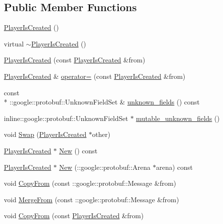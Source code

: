 \subsection*{Public Member Functions}
\begin{DoxyCompactItemize}
\item 
\hyperlink{class_player_is_created_a02bf8ba34256de7cdf0660fc59c87ddc}{Player\-Is\-Created} ()
\item 
virtual \hyperlink{class_player_is_created_a03ae27dcddd046854572755260a782b1}{$\sim$\-Player\-Is\-Created} ()
\item 
\hyperlink{class_player_is_created_ae905e532042d12b2c289b3affb8dd903}{Player\-Is\-Created} (const \hyperlink{class_player_is_created}{Player\-Is\-Created} \&from)
\item 
\hyperlink{class_player_is_created}{Player\-Is\-Created} \& \hyperlink{class_player_is_created_aef6d923f253b5eb33ac0623f73290e4e}{operator=} (const \hyperlink{class_player_is_created}{Player\-Is\-Created} \&from)
\item 
const \\*
\-::google\-::protobuf\-::\-Unknown\-Field\-Set \& \hyperlink{class_player_is_created_afee68e43e7b6d43a14cbe716d304d506}{unknown\-\_\-fields} () const 
\item 
inline\-::google\-::protobuf\-::\-Unknown\-Field\-Set $\ast$ \hyperlink{class_player_is_created_a04590b849c6fb6b6f3fdde289e6c8d3c}{mutable\-\_\-unknown\-\_\-fields} ()
\item 
void \hyperlink{class_player_is_created_a63a11c81586cf8e47746156ccae99730}{Swap} (\hyperlink{class_player_is_created}{Player\-Is\-Created} $\ast$other)
\item 
\hyperlink{class_player_is_created}{Player\-Is\-Created} $\ast$ \hyperlink{class_player_is_created_a52f0592fe68576e9cd73e2c892d514ac}{New} () const 
\item 
\hyperlink{class_player_is_created}{Player\-Is\-Created} $\ast$ \hyperlink{class_player_is_created_a224bc1932f4a20ea62cc4bd0107d270f}{New} (\-::google\-::protobuf\-::\-Arena $\ast$arena) const 
\item 
void \hyperlink{class_player_is_created_a5c404f5ee81f48971becae826bd7afec}{Copy\-From} (const \-::google\-::protobuf\-::\-Message \&from)
\item 
void \hyperlink{class_player_is_created_ac6b4f0e6f5c1f465c5dbd4972cf168e3}{Merge\-From} (const \-::google\-::protobuf\-::\-Message \&from)
\item 
void \hyperlink{class_player_is_created_ab43a5a54241664baf89386f9d0c1a220}{Copy\-From} (const \hyperlink{class_player_is_created}{Player\-Is\-Created} \&from)

\end{DoxyCompactItemize}
